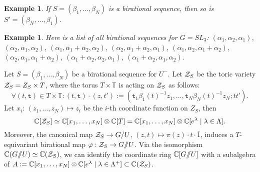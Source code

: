 \documentclass{emsprocart}
\newtheorem{example}[theorem]{Example}
\theoremstyle{definition}
\begin{document}

\begin{example}\rm
If $S=({\beta_1},\ldots,{\beta_N})$ is a birational sequence, then so is $S'=({\beta_N},\ldots,{\beta_1})$.
\end{example}
\begin{example}\rm
Here is a list of all birational sequences for $G=SL_3$: $(\alpha_1,\alpha_2,\alpha_1)$, $(\alpha_2,\alpha_1,\alpha_2)$, $(\alpha_1,\alpha_1+\alpha_2,\alpha_2)$, $(\alpha_2,\alpha_1+\alpha_2,\alpha_1)$, $(\alpha_1,\alpha_2,\alpha_1+\alpha_2)$, $(\alpha_2,\alpha_1,\alpha_1+\alpha_2)$, $(\alpha_1+\alpha_2,\alpha_2,\alpha_1)$, $(\alpha_1+\alpha_2,\alpha_1,\alpha_2)$.
\end{example}


Let $S=({\beta_1},\ldots,{\beta_N})$ be a birational sequence for $U^-$.
Let ${\cal Z}_S$ be the toric variety ${\cal Z}_S= Z_S\times T$, where the torus
$T\times \mathbb T$ is acting on ${\cal Z}_S$ as follows:
$$
\forall (t,\texttt{t})\in T\times \mathbb T:(t,\texttt{t})\cdot(z,t'):=
(\texttt{t}_1 \beta_1(t)^{-1}z_1,\ldots, \texttt{t}_N \beta_N(t)^{-1}z_N;tt').
$$
Let $x_i:\, (z_1 ,\ldots,z_N)\mapsto z_i$ be the $i$-th coordinate function on ${Z}_S$,
then
$$
\mathbb C[{\cal Z}_S]\simeq \mathbb C[x_1,\ldots,x_N]\otimes \mathbb C[T]=\mathbb C[x_1,\ldots,x_N]\otimes\mathbb C[e^{\lambda}\mid\lambda\in\Lambda].
$$
Moreover, the canonical map ${\cal Z}_S\rightarrow G/ U$, $(z,t)\mapsto
\pi(z)\cdot t\cdot \bar{1}$, induces a $T$-equivariant birational map $\varphi: {\cal Z}_S\rightarrow G/\hskip -3.5pt / U$.
Via the isomorphism $\mathbb C(G/\hskip -3.5pt/U)\simeq\mathbb C({\cal Z}_S)$,
we can identify the coordinate ring $\mathbb C[G/\hskip -3.5pt/U]$ with a subalgebra of
$A:=\mathbb C[x_1,\ldots,x_N]\otimes\mathbb C[e^{\lambda}\mid\lambda\in\Lambda^+]\subset \mathbb C({\cal Z}_S)$.
\end{document}
